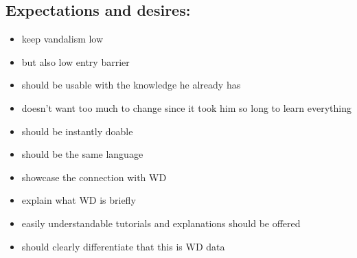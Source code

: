 \documentclass{article}
\begin{document}
\subsection{Expectations and desires:}
\begin{itemize}
\item keep vandalism low
\item but also low entry barrier
\item should be usable with the knowledge he already has
\item doesn't want too much to change since it took him so long to learn everything
\item should be instantly doable
\item should be the same language
\item showcase the connection with WD
\item explain what WD is briefly
\item easily understandable tutorials and explanations should be offered
\item should clearly differentiate that this is WD data
\end{itemize}
\end{document}
